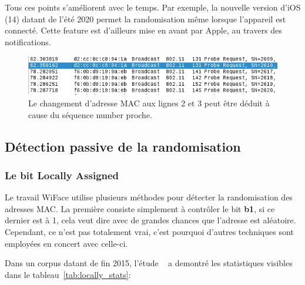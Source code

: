 Tous ces points s'améliorent avec le temps. 
Par exemple, la nouvelle version d'iOS (14) datant de l'été 2020 permet la randomisation même lorsque l'appareil est connecté.
Cette feature est d'ailleurs mise en avant par Apple, au travers des notifications. \cite{APPLESUPPPRIVATE} 

\begin{figure}[H]
	\centering
	\includegraphics[width=12cm]{images/probe/sn.png}
	\caption{Le changement d'adresse MAC aux lignes 2 et 3 peut être déduit à cause du séquence number proche.}
	\label{fig:seqnumber}
\end{figure}

\subsection{Détection passive de la randomisation}

\subsubsection{Le bit Locally Assigned}
Le travail WiFace utilise plusieurs méthodes pour détecter la randomisation des adresses MAC. 
La première consiste simplement à contrôler le bit \textbf{b1}, si ce dernier est à 1, cela veut
dire avec de grandes chances que l'adresse est aléatoire. Cependant, ce n'est pas totalement vrai, c'est pourquoi
d'autres techniques sont employées en concert avec celle-ci. 

Dans un corpus datant de fin 2015, l'étude ~\cite{ASMARMD} a demontré les statistiques visibles dans le tableau~\ref{tab:locally_stats}: 

\begin{table}[H]
	\caption{Statistiques sur la randomisation - Locally Assigned bit}
	\label{tab:locally_stats}
	\end{table}


